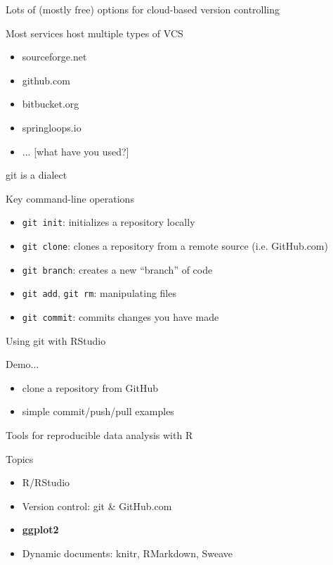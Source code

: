 \documentclass[table]{beamer}\usepackage[]{graphicx}\usepackage[]{color}
\begin{document}
\begin{frame}{Lots of (mostly free) options for cloud-based version controlling}

\begin{block}{Most services host multiple types of VCS}
\begin{itemize}
\item sourceforge.net
\item github.com
\item bitbucket.org
\item springloops.io
\item ... [what have you used?]
\end{itemize}
\end{block}

\end{frame}



\begin{frame}{git is a dialect}

\begin{block}{Key command-line operations}
\begin{itemize}
\item {\tt git init}: initializes a repository locally
\item {\tt git clone}: clones a repository from a remote source (i.e. GitHub.com)
\item {\tt git branch}: creates a new ``branch'' of code
\item {\tt git add}, {\tt git rm}: manipulating files 
\item {\tt git commit}: commits changes you have made
\end{itemize}
\end{block}

\end{frame}


\begin{frame}{Using git with RStudio}

\begin{block}{Demo... }
\begin{itemize}
        \item clone a repository from GitHub
        \item simple commit/push/pull examples
\end{itemize}
\end{block}

\end{frame}


\begin{frame}{Tools for reproducible data analysis with R}

\begin{block}{Topics}
\begin{itemize}
        \item R/RStudio
       \item Version control: git \& GitHub.com
         \item \textbf{ggplot2}
        \item Dynamic documents: knitr, RMarkdown, Sweave
 \end{itemize}
\end{block}

\end{frame}
\end{document}
